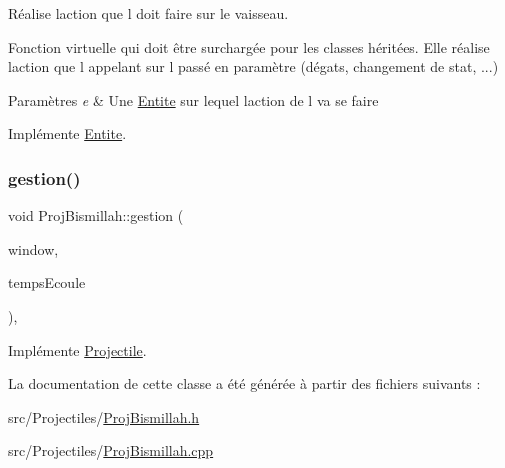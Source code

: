Réalise l\textquotesingle{}action que l doit faire sur le vaisseau. 

Fonction virtuelle qui doit être surchargée pour les classes héritées. Elle réalise l\textquotesingle{}action que l appelant sur l passé en paramètre (dégats, changement de stat, ...) 
\begin{DoxyParams}{Paramètres}
{\em e} & Une {\ttfamily \hyperlink{class_entite}{Entite}} sur lequel l\textquotesingle{}action de l va se faire \\
\hline
\end{DoxyParams}


Implémente \hyperlink{class_entite_a848ec47afac1d7ba970a2bcab5dc7b3b}{Entite}.

\mbox{\label{class_proj_bismillah_a6db489d8ffa3986d073518cf79416c98}} 
\subsubsection{\texorpdfstring{gestion()}{gestion()}}
{\footnotesize\ttfamily void Proj\+Bismillah\+::gestion (\begin{DoxyParamCaption}\item[{sf\+::\+Render\+Window \&}]{window,  }\item[{sf\+::\+Time}]{temps\+Ecoule }\end{DoxyParamCaption})\hspace{0.3cm}{\ttfamily [inline]}, {\ttfamily [virtual]}}



Implémente \hyperlink{class_projectile_a09e02b793473660fc59a329a4dfea0ec}{Projectile}.



La documentation de cette classe a été générée à partir des fichiers suivants \+:\begin{DoxyCompactItemize}
\item 
src/\+Projectiles/\hyperlink{_proj_bismillah_8h}{Proj\+Bismillah.\+h}\item 
src/\+Projectiles/\hyperlink{_proj_bismillah_8cpp}{Proj\+Bismillah.\+cpp}\end{DoxyCompactItemize}

